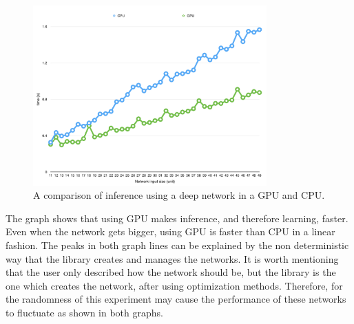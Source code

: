 \begin{figure}[hbt]
    \begin{center}
    \includegraphics[width=0.8\textwidth]{figures/graph.png}
    \caption{A comparison of inference using a deep network in a GPU and CPU.}
    \label{fig:graph}
    \end{center}
\end{figure}

The graph shows that using GPU makes inference, and therefore learning, faster.
Even when the network gets bigger, using GPU is faster than CPU in a linear fashion.
The peaks in both graph lines can be explained by the non deterministic way that the library creates and manages the networks.
It is worth mentioning that the user only described how the network should be, but the library is the one which creates the network, after using optimization methods.
Therefore, for the randomness of this experiment may cause the performance of these networks to fluctuate as shown in both graphs.
